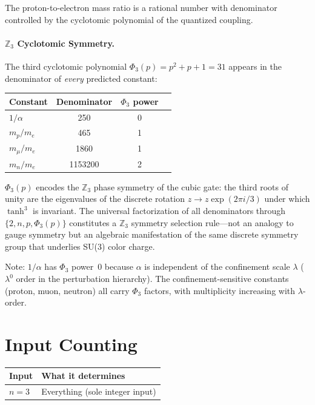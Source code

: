 \documentclass[12pt,a4paper]{article}
\theoremstyle{definition}
\newcommand{\Phithree}{\Phi_3}
\begin{document}
The proton-to-electron mass ratio is a rational number with denominator
controlled by the cyclotomic polynomial of the quantized coupling.

\paragraph{$\mathbb{Z}_3$ Cyclotomic Symmetry.}
The third cyclotomic polynomial $\Phithree(p) = p^2 + p + 1 = 31$ appears
in the denominator of \emph{every} predicted constant:

\begin{center}
\begin{tabular}{lccc}
\toprule
Constant & Denominator & $\Phithree$ power \\
\midrule
$1/\alpha$  &    250 & 0 \\
$m_p/m_e$   &    465 & 1 \\
$m_\mu/m_e$ &   1860 & 1 \\
$m_n/m_e$   & 1153200 & 2 \\
\bottomrule
\end{tabular}
\end{center}

$\Phithree(p)$ encodes the $\mathbb{Z}_3$ phase symmetry of the cubic gate:
the third roots of unity are the eigenvalues of the discrete rotation
$z \to z \exp(2\pi i/3)$ under which $\tanh^3$ is invariant. The universal
factorization of all denominators through $\{2, n, p, \Phithree(p)\}$
constitutes a $\mathbb{Z}_3$ symmetry selection rule---not an analogy to
gauge symmetry but an algebraic manifestation of the same discrete symmetry
group that underlies SU(3) color charge.

Note: $1/\alpha$ has $\Phithree$ power~0 because $\alpha$ is independent
of the confinement scale $\lambda$ ($\lambda^0$ order in the perturbation
hierarchy). The confinement-sensitive constants (proton, muon, neutron) all
carry $\Phithree$ factors, with multiplicity increasing with
$\lambda$-order.

\section{Input Counting}

\begin{center}
\begin{tabular}{ll}
\toprule
Input & What it determines \\
\midrule
$n = 3$ & Everything (sole integer input) \\
\bottomrule
\end{tabular}
\end{center}
\end{document}
